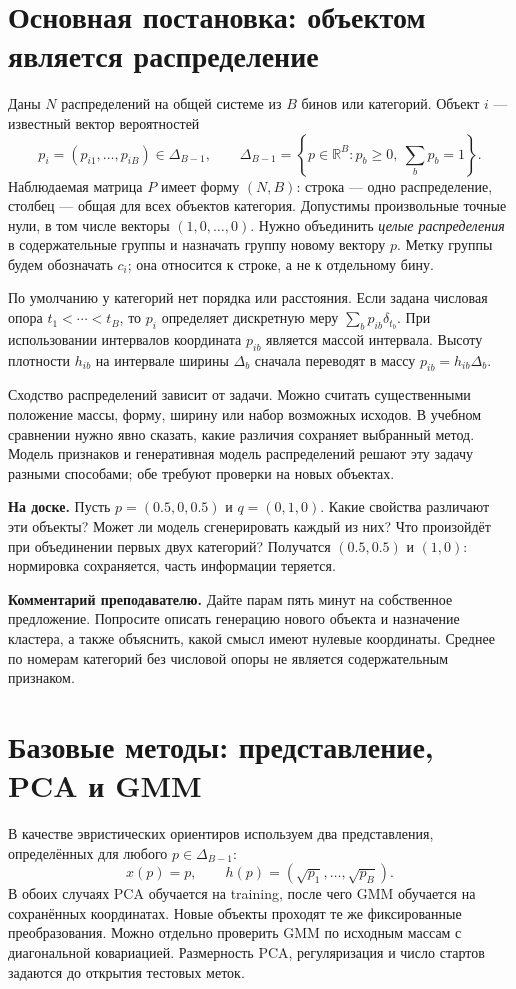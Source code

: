 \documentclass[11pt,a4paper]{article}
\newcommand{\R}{\mathbb R}
\newcommand{\board}[1]{\par\textbf{На доске.} #1\par}
\newcommand{\teach}[1]{\par\textbf{Комментарий преподавателю.} #1\par}
\begin{document}
\section{Основная постановка: объектом является распределение}

Даны $N$ распределений на общей системе из $B$ бинов или категорий.
Объект $i$ --- известный вектор вероятностей
\[
 p_i=(p_{i1},\ldots,p_{iB})\in\Delta_{B-1},\qquad
 \Delta_{B-1}=\left\{p\in\R^B:p_b\geq0,\ \sum_bp_b=1\right\}.
\]
Наблюдаемая матрица $P$ имеет форму $(N,B)$: строка --- одно распределение,
столбец --- общая для всех объектов категория. Допустимы произвольные
точные нули, в том числе векторы $(1,0,\ldots,0)$.
Нужно объединить \emph{целые распределения} в содержательные группы
и назначать группу новому вектору $p$. Метку группы будем обозначать $c_i$;
она относится к строке, а не к отдельному бину.

По умолчанию у категорий нет порядка или расстояния. Если задана числовая
опора $t_1<\cdots<t_B$, то $p_i$ определяет дискретную меру
$\sum_bp_{ib}\delta_{t_b}$. При использовании интервалов координата
$p_{ib}$ является массой интервала. Высоту плотности $h_{ib}$ на интервале
ширины $\Delta_b$ сначала переводят в массу $p_{ib}=h_{ib}\Delta_b$.

Сходство распределений зависит от задачи. Можно считать существенными
положение массы, форму, ширину или набор возможных исходов. В учебном
сравнении нужно явно сказать, какие различия сохраняет выбранный метод.
Модель признаков и генеративная модель распределений решают эту задачу
разными способами; обе требуют проверки на новых объектах.

\board{Пусть $p=(0.5,0,0.5)$ и $q=(0,1,0)$. Какие свойства различают
эти объекты? Может ли модель сгенерировать каждый из них? Что произойдёт
при объединении первых двух категорий? Получатся $(0.5,0.5)$ и $(1,0)$:
нормировка сохраняется, часть информации теряется.}

\teach{Дайте парам пять минут на собственное предложение. Попросите
описать генерацию нового объекта и назначение кластера, а также объяснить,
какой смысл имеют нулевые координаты. Среднее по номерам категорий без
числовой опоры не является содержательным признаком.}

\section{Базовые методы: представление, PCA и GMM}

В качестве эвристических ориентиров используем два представления,
определённых для любого $p\in\Delta_{B-1}$:
\[
 x(p)=p,\qquad h(p)=(\sqrt{p_1},\ldots,\sqrt{p_B}).
\]
В обоих случаях PCA обучается на training, после чего GMM обучается на
сохранённых координатах. Новые объекты проходят те же фиксированные
преобразования. Можно отдельно проверить GMM по исходным массам с
диагональной ковариацией. Размерность PCA, регуляризация и число стартов
задаются до открытия тестовых меток.
\end{document}
